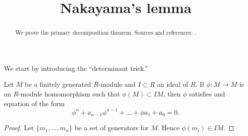 \documentclass{ximera}
\title{Nakayama's lemma}
\begin{document}
\begin{abstract}
  We prove the primary decomposition theorem. Sources and references:
  \cite{AM1969,jpS2000}.
\end{abstract}
\maketitle

We start by introducing the ``determinant trick.''

\begin{proposition}
  Let $M$ be a finitely generated $R$-module and $I\subset R$ an ideal
  of $R$. If $\phi:M\to M$ is an $R$-module homomorphism such that
  $\phi(M)\subset I M$, then $\phi$ satisfies and equation of the form
  \[
  \phi^n + a_{n-1}\phi^{n-1} + \dots + \phi a_1 + a_0 = 0.
  \]
  \begin{proof}
    Let $\{m_1,\dots, m_n\}$ be a set of generators for $M$. Hence $\phi(m_i) \in I M$. 
  \end{proof}
\end{proposition}

\begin{corollary}
\end{corollary}

\begin{corollary}
\end{corollary}
\end{document}
